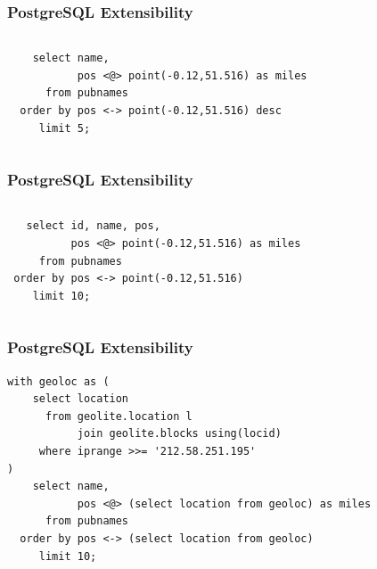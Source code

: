 \documentclass{beamer}
\begin{document}
\begin{frame}[fragile]
  \frametitle{PostgreSQL Extensibility}

\begin{columns}
\begin{verbatim}
    select name,
           pos <@> point(-0.12,51.516) as miles
      from pubnames
  order by pos <-> point(-0.12,51.516) desc
     limit 5;
\end{verbatim}
\end{columns}
\end{frame}

\begin{frame}[fragile]
  \frametitle{PostgreSQL Extensibility}

\begin{columns}
\begin{verbatim}
   select id, name, pos,
          pos <@> point(-0.12,51.516) as miles
     from pubnames
 order by pos <-> point(-0.12,51.516)
    limit 10;
\end{verbatim}
\end{columns}
\end{frame}

\begin{frame}[fragile]
  \frametitle{PostgreSQL Extensibility}

\begin{verbatim}
with geoloc as (
    select location
      from geolite.location l
           join geolite.blocks using(locid)
     where iprange >>= '212.58.251.195'
)
    select name,
           pos <@> (select location from geoloc) as miles
      from pubnames
  order by pos <-> (select location from geoloc)
     limit 10;
\end{verbatim}
\end{frame}
\end{document}
